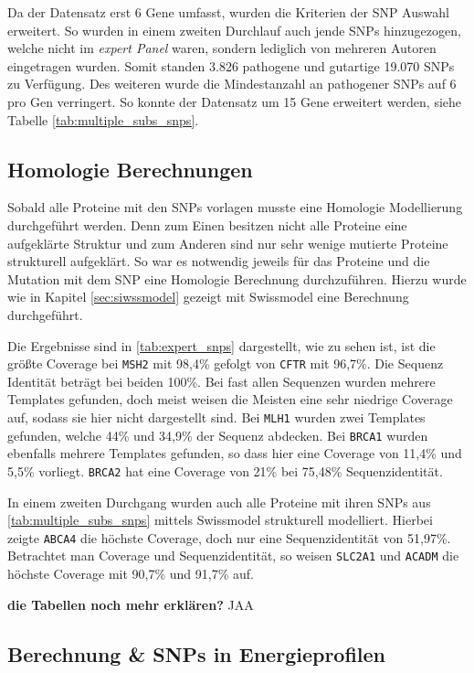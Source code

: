 Da der Datensatz erst 6 Gene umfasst, wurden die Kriterien der \ac{SNP} Auswahl erweitert. So wurden in einem zweiten Durchlauf auch jende \ac{SNP}s hinzugezogen, welche nicht im \emph{expert Panel} waren, sondern lediglich von mehreren Autoren eingetragen wurden. Somit standen 3.826 pathogene und gutartige 19.070 \ac{SNP}s zu Verfügung. Des weiteren wurde die Mindestanzahl an pathogener SNPs auf 6 pro Gen verringert. So konnte der Datensatz um 15 Gene erweitert werden, siehe Tabelle \ref{tab:multiple_subs_snps}.


\subsection{Homologie Berechnungen}

Sobald alle Proteine mit den \ac{SNP}s vorlagen musste eine Homologie Modellierung durchgeführt werden. Denn zum Einen besitzen nicht alle Proteine eine aufgeklärte Struktur und zum Anderen sind nur sehr wenige mutierte Proteine strukturell aufgeklärt. So war es notwendig jeweils für das Proteine und die Mutation mit dem \ac{SNP} eine Homologie Berechnung durchzuführen. Hierzu wurde wie in Kapitel \ref{sec:siwssmodel} gezeigt mit Swissmodel eine Berechnung durchgeführt.

Die Ergebnisse sind in \ref{tab:expert_snps} dargestellt, wie zu sehen ist, ist die größte Coverage bei \texttt{MSH2} mit 98,4\% gefolgt von \texttt{CFTR} mit 96,7\%. Die Sequenz Identität beträgt bei beiden 100\%. Bei fast allen Sequenzen wurden mehrere Templates gefunden, doch meist weisen die Meisten eine sehr niedrige Coverage auf, sodass sie hier nicht dargestellt sind. Bei \texttt{MLH1} wurden zwei Templates gefunden, welche 44\% und 34,9\% der Sequenz abdecken. Bei \texttt{BRCA1} wurden ebenfalls mehrere Templates gefunden, so dass hier eine Coverage von 11,4\% und 5,5\% vorliegt. \texttt{BRCA2} hat eine Coverage von 21\% bei 75,48\% Sequenzidentität.

In einem zweiten Durchgang wurden auch alle Proteine mit ihren SNPs aus \ref{tab:multiple_subs_snps} mittels Swissmodel strukturell modelliert. Hierbei zeigte \texttt{ABCA4} die höchste Coverage, doch nur eine Sequenzidentität von 51,97\%. Betrachtet man Coverage und Sequenzidentität, so weisen \texttt{SLC2A1} und \texttt{ACADM} die höchste Coverage mit 90,7\% und 91,7\% auf. 

\textbf{die Tabellen noch mehr erklären?} JAA 



\subsection{Berechnung \& SNPs in Energieprofilen}

